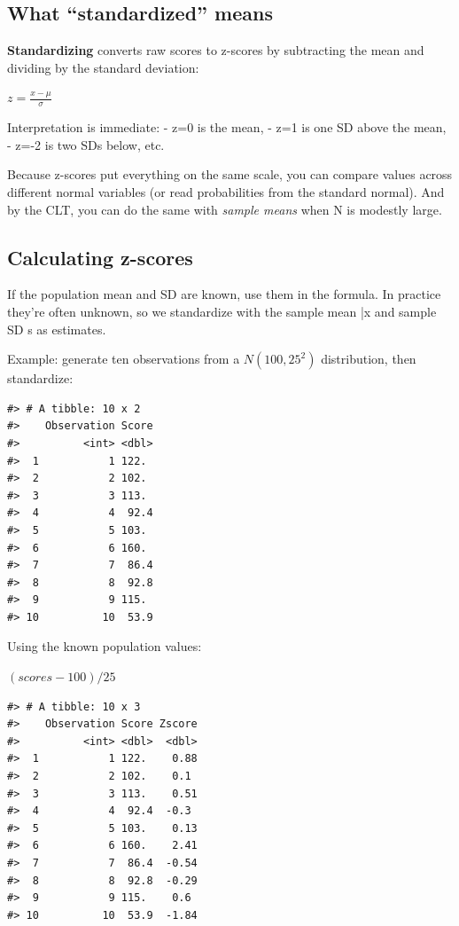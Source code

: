\documentclass[
  letterpaper,
  DIV=11,
  numbers=noendperiod]{scrreprt}
\begin{document}
\subsection{What ``standardized'' means}\label{what-standardized-means}

\textbf{Standardizing} converts raw scores to z-scores by subtracting
the mean and dividing by the standard deviation:

\(z=\frac{x-\mu}{\sigma}\)

Interpretation is immediate: - z=0 is the mean, - z=1 is one SD above
the mean, - z=-2 is two SDs below, etc.

Because z-scores put everything on the same scale, you can compare
values across different normal variables (or read probabilities from the
standard normal). And by the CLT, you can do the same with \emph{sample
means} when N is modestly large.

\subsection{Calculating z-scores}\label{calculating-z-scores}

If the population mean and SD are known, use them in the formula. In
practice they're often unknown, so we standardize with the sample mean
\bar x and sample SD s as estimates.

Example: generate ten observations from a \(N(100, 25^2)\) distribution,
then standardize:

\begin{verbatim}
#> # A tibble: 10 x 2
#>    Observation Score
#>          <int> <dbl>
#>  1           1 122. 
#>  2           2 102. 
#>  3           3 113. 
#>  4           4  92.4
#>  5           5 103. 
#>  6           6 160. 
#>  7           7  86.4
#>  8           8  92.8
#>  9           9 115. 
#> 10          10  53.9
\end{verbatim}

Using the known population values:

\((scores - 100)/25\)

\begin{verbatim}
#> # A tibble: 10 x 3
#>    Observation Score Zscore
#>          <int> <dbl>  <dbl>
#>  1           1 122.    0.88
#>  2           2 102.    0.1 
#>  3           3 113.    0.51
#>  4           4  92.4  -0.3 
#>  5           5 103.    0.13
#>  6           6 160.    2.41
#>  7           7  86.4  -0.54
#>  8           8  92.8  -0.29
#>  9           9 115.    0.6 
#> 10          10  53.9  -1.84
\end{verbatim}
\end{document}
